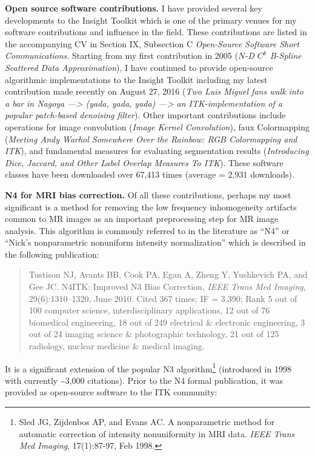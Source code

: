 \documentclass[11pt,]{article}
\let\rmarkdownfootnote\footnote%
\def\footnote{\protect\rmarkdownfootnote}
\begin{document}
\textbf{Open source software contributions.} I have provided several key
developments to the Insight Toolkit which is one of the primary venues
for my software contributions and influence in the field. These
contributions are listed in the accompanying CV in Section IX,
Subsection C \emph{Open-Source Software Short Communications}. Starting
from my first contribution in 2005 (\emph{\(N\)-D \(C^k\) B-Spline
Scattered Data Approximation}), I have continued to provide open-source
algorithmic implementations to the Insight Toolkit including my latest
contribution made recently on August 27, 2016 (\emph{Two Luis Miguel
fans walk into a bar in Nagoya ---\textgreater{} (yada, yada, yada)
---\textgreater{} an ITK-implementation of a popular patch-based
denoising filter}). Other important contributions include operations for
image convolution (\emph{Image Kernel Convolution}), faux Colormapping
(\emph{Meeting Andy Warhol Somewhere Over the Rainbow: RGB Colormapping
and ITK}), and fundamental measures for evaluating segmentation results
(\emph{Introducing Dice, Jaccard, and Other Label Overlap Measures To
ITK}). These software classes have been downloaded over 67,413 times
(average = 2,931 downloads).

\textbf{N4 for MRI bias correction.} Of all these contributions, perhaps
my most significant is a method for removing the low frequency
inhomogeneity artifacts common to MR images as an important
preprocessing step for MR image analysis. This algorithm is commonly
referred to in the literature as ``N4'' or ``Nick's nonparametric
nonuniform intensity normalization'' which is described in the following
publication:

\begin{quote}
Tustison NJ, Avants BB, Cook PA, Egan A, Zheng Y, Yushkevich PA, and Gee
JC. N4ITK: Improved N3 Bias Correction, \emph{IEEE Trans Med Imaging},
29(6):1310--1320, June 2010. Cited 367 times; IF = 3.390; Rank 5 out of
100 computer science, interdisciplinary applications, 12 out of 76
biomedical engineering, 18 out of 249 electrical \& electronic
engineering, 3 out of 24 imaging science \& photographic technology, 21
out of 125 radiology, nuclear medicine \& medical imaging.
\end{quote}

It is a significant extension of the popular N3 algorithm\footnote{Sled
  JG, Zijdenbos AP, and Evans AC. A nonparametric method for automatic
  correction of intensity nonuniformity in MRI data. \emph{IEEE Trans
  Med Imaging}, 17(1):87-97, Feb 1998.} (introduced in 1998 with
currently \textasciitilde{}3,000 citations). Prior to the N4 formal
publication, it was provided as open-source software to the ITK
community:
\end{document}
